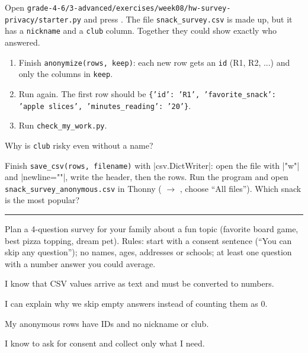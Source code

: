 \namedateline

\begin{core}
Open \texttt{grade-4-6/3-advanced/exercises/week08/hw-survey-privacy/starter.py} and press . The file \texttt{snack\_survey.csv} is made up, but it has a \texttt{nickname} and a \texttt{club} column. Together they could show exactly who answered.
\begin{enumerate}[itemsep=1pt]
  \item Finish \texttt{anonymize(rows, keep)}: each new row gets an \texttt{id} (R1, R2, ...) and only the columns in \texttt{keep}.
  \item Run again. The first row should be \texttt{\{'id': 'R1', 'favorite\_snack': 'apple slices', 'minutes\_reading': '20'\}}.
  \item Run \texttt{check\_my\_work.py}.
\end{enumerate}
Why is \texttt{club} risky even without a name? 
\end{core}

\begin{challenge}
Finish \texttt{save\_csv(rows, filename)} with \py|csv.DictWriter|: open the file with \py|"w"| and \py|newline=""|, write the header, then the rows. Run the program and open \texttt{snack\_survey\_anonymous.csv} in Thonny ( $\rightarrow$ , choose \enquote{All files}). Which snack is the most popular? \rule{4cm}{0.4pt}
\end{challenge}

\begin{creative}
Plan a 4-question survey for your family about a fun topic (favorite board game, best pizza topping, dream pet). Rules: start with a consent sentence (\enquote{You can skip any question}); no names, ages, addresses or schools; at least one question with a number answer you could average.
\end{creative}

\begin{selfcheck}
  \item I know that CSV values arrive as text and must be converted to numbers.
  \item I can explain why we skip empty answers instead of counting them as 0.
  \item My anonymous rows have IDs and no nickname or club.
  \item I know to ask for consent and collect only what I need.
\end{selfcheck}
